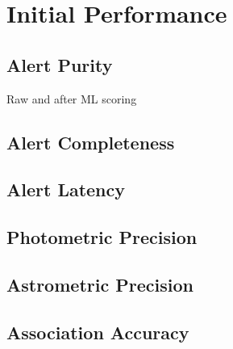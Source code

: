 \section{Initial Performance} \label{sec:performance}



\subsection{Alert Purity} \label{sec:purity}

Raw and after ML scoring


\subsection{Alert Completeness}

\subsection{Alert Latency}

\subsection{Photometric Precision}

\subsection{Astrometric Precision}

\subsection{Association Accuracy}
